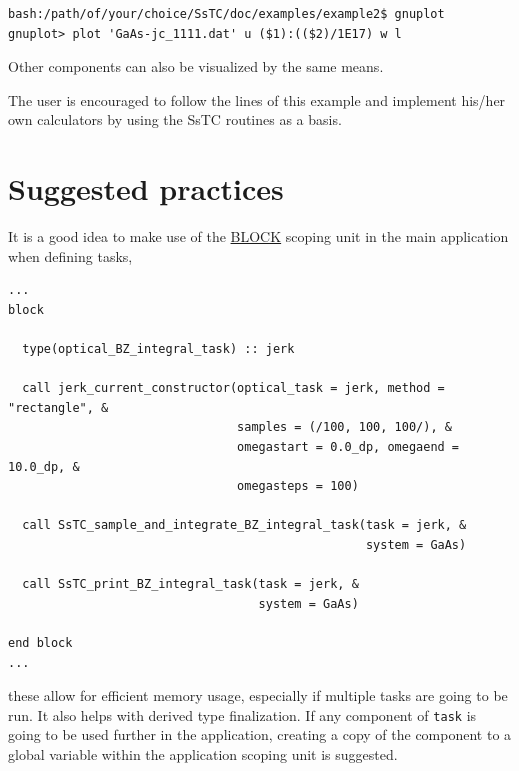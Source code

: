 \documentclass[10pt,a4paper]{article}
\begin{document}
\begin{codebox}{}
\begin{verbatim}
bash:/path/of/your/choice/SsTC/doc/examples/example2$ gnuplot
gnuplot> plot 'GaAs-jc_1111.dat' u ($1):(($2)/1E17) w l
\end{verbatim}
\end{codebox}
Other components can also be visualized by the same means.

The user is encouraged to follow the lines of this example and implement his/her own calculators by using the SsTC routines as a basis.
\section{Suggested practices}
It is a good idea to make use of the \href{https://www.intel.com/content/www/us/en/docs/fortran-compiler/developer-guide-reference/2023-0/block.html}{BLOCK} scoping unit in the main application when defining tasks,
\begin{codebox}{}
\begin{lstlisting}[caption={Definition of SsTC tasks in BLOCK scoping units.},captionpos=b]
...
block

  type(optical_BZ_integral_task) :: jerk

  call jerk_current_constructor(optical_task = jerk, method = "rectangle", &
                                samples = (/100, 100, 100/), &
                                omegastart = 0.0_dp, omegaend = 10.0_dp, &
                                omegasteps = 100)

  call SsTC_sample_and_integrate_BZ_integral_task(task = jerk, &
                                                  system = GaAs)

  call SsTC_print_BZ_integral_task(task = jerk, &
                                   system = GaAs)

end block
...
\end{lstlisting}
\end{codebox}
these allow for efficient memory usage, especially if multiple tasks are going to be run. It also helps with derived type finalization. If any component of \verb|task| is going to be used further in the application, creating a copy of the component to a global variable within the application scoping unit is suggested.


\end{document}
